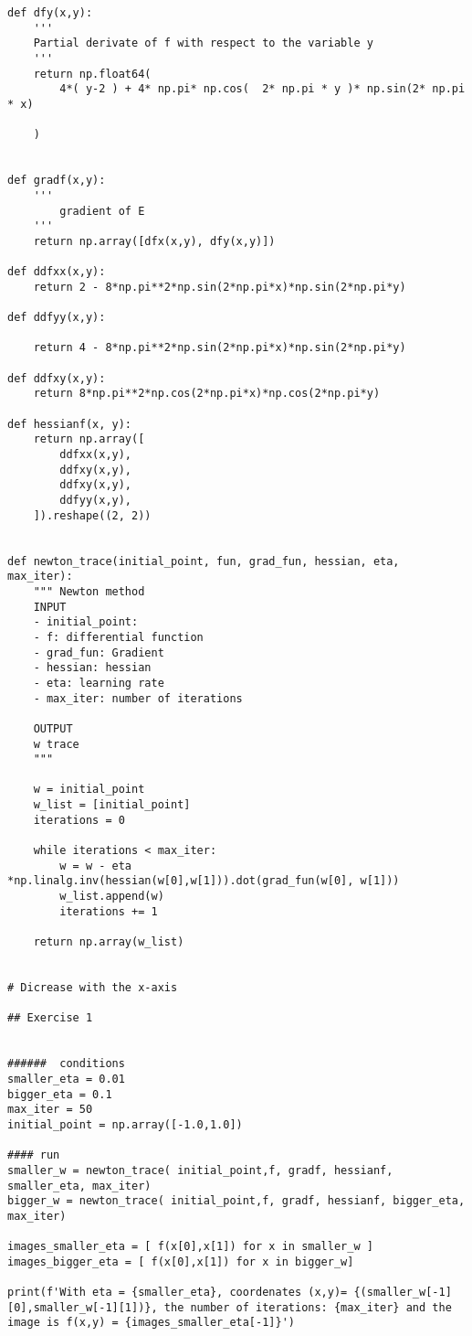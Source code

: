 \begin{verbatim}
def dfy(x,y):
    '''
    Partial derivate of f with respect to the variable y
    '''
    return np.float64(
        4*( y-2 ) + 4* np.pi* np.cos(  2* np.pi * y )* np.sin(2* np.pi * x)

    )


def gradf(x,y):
    ''' 
        gradient of E
    '''
    return np.array([dfx(x,y), dfy(x,y)])

def ddfxx(x,y):
    return 2 - 8*np.pi**2*np.sin(2*np.pi*x)*np.sin(2*np.pi*y)

def ddfyy(x,y):
   
    return 4 - 8*np.pi**2*np.sin(2*np.pi*x)*np.sin(2*np.pi*y)

def ddfxy(x,y):
    return 8*np.pi**2*np.cos(2*np.pi*x)*np.cos(2*np.pi*y)

def hessianf(x, y):
    return np.array([
        ddfxx(x,y),
        ddfxy(x,y),
        ddfxy(x,y),
        ddfyy(x,y),
    ]).reshape((2, 2))


def newton_trace(initial_point, fun, grad_fun, hessian, eta, max_iter):
    """ Newton method
    INPUT 
    - initial_point: 
    - f: differential function
    - grad_fun: Gradient
    - hessian: hessian
    - eta: learning rate
    - max_iter: number of iterations

    OUTPUT 
    w trace
    """

    w = initial_point
    w_list = [initial_point]
    iterations = 0

    while iterations < max_iter:
        w = w - eta *np.linalg.inv(hessian(w[0],w[1])).dot(grad_fun(w[0], w[1]))
        w_list.append(w)
        iterations += 1

    return np.array(w_list)


# Dicrease with the x-axis

## Exercise 1
 

######  conditions  
smaller_eta = 0.01
bigger_eta = 0.1 
max_iter = 50
initial_point = np.array([-1.0,1.0])

#### run 
smaller_w = newton_trace( initial_point,f, gradf, hessianf, smaller_eta, max_iter)
bigger_w = newton_trace( initial_point,f, gradf, hessianf, bigger_eta, max_iter)

images_smaller_eta = [ f(x[0],x[1]) for x in smaller_w ]
images_bigger_eta = [ f(x[0],x[1]) for x in bigger_w]

print(f'With eta = {smaller_eta}, coordenates (x,y)= {(smaller_w[-1][0],smaller_w[-1][1])}, the number of iterations: {max_iter} and the image is f(x,y) = {images_smaller_eta[-1]}')


\end{verbatim}
